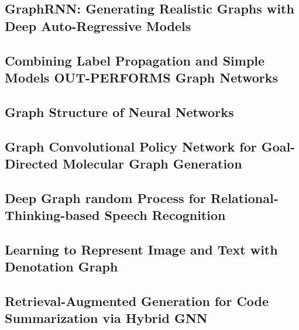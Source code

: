 \subsection{GraphRNN: Generating Realistic Graphs with Deep Auto-Regressive Models}


\subsection{Combining Label Propagation and Simple Models OUT-PERFORMS Graph Networks}


\subsection{Graph Structure of Neural Networks}


\subsection{Graph Convolutional Policy Network for Goal-Directed Molecular Graph Generation}


\subsection{Deep Graph random Process for Relational-Thinking-based Speech Recognition}


\subsection{Learning to Represent Image and Text with Denotation Graph}


\subsection{Retrieval-Augmented Generation for Code Summarization via Hybrid GNN}

